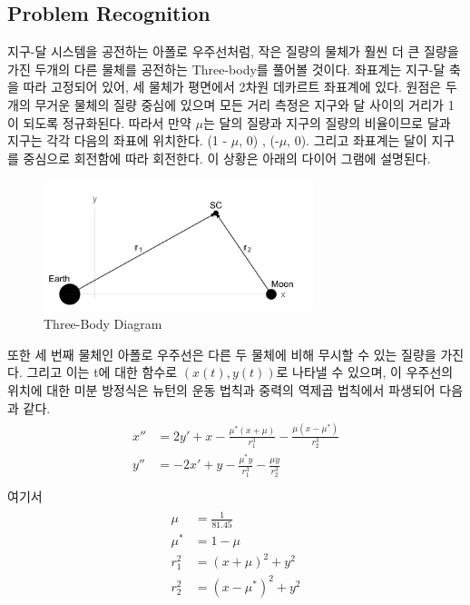 \documentclass[11pt]{article}
\begin{document}
\subsection{Problem Recognition} 
지구-달 시스템을 공전하는 아폴로 우주선처럼, 작은 질량의 물체가 훨씬 더 큰 질량을 가진 두개의 다른 물체를 공전하는 Three-body를 풀어볼 것이다. 좌표계는 지구-달 축을 따라 고정되어 있어, 세 물체가 평면에서 2차원 데카르트 좌표계에 있다. 원점은 두개의 무거운 물체의 질량 중심에 있으며 모든 거리 측정은 지구와 달 사이의 거리가 1이 되도록 정규화된다. 따라서 만약 $\mu$는 달의 질량과 지구의 질량의 비율이므로 달과 지구는 각각 다음의 좌표에 위치한다. (1 - $\mu$, 0) , (-$\mu$, 0). 그리고 좌표계는 달이 지구를 중심으로 회전함에 따라 회전한다. 이 상황은 아래의 다이어 그램에 설명된다.
\begin{figure}[!ht]
  \centering
  \includegraphics[width=0.7\textwidth]{Three.png}
  \caption{Three-Body Diagram}
\end{figure}
또한 세 번째 물체인 아폴로 우주선은 다른 두 물체에 비해 무시할 수 있는 질량을 가진다. 그리고 이는 t에 대한 함수로 $(x(t), y(t))$로 나타낼 수 있으며, 이 우주선의 위치에 대한 미분 방정식은 뉴턴의 운동 법칙과 중력의 역제곱 법칙에서 파생되어 다음과 같다.
\begin{equation}
\begin{split}
\begin{aligned}
x'' &= 2y' + x - \frac{\mu^* (x + \mu)}{r_1^3} - \frac{\mu (x - \mu^*)}{r_2^3} \\
y'' &= -2x' + y - \frac{\mu^* y}{r_1^3} - \frac{\mu y}{r_2^3} \\
\end{aligned}
\end{split}
\end{equation}
여기서 
\begin{equation}
\begin{split}
\begin{aligned}
\mu &= \frac{1}{81.45} \\
\mu^* &= 1 - \mu \\
r_1^2 &= (x + \mu)^2 + y^2 \\
r_2^2 &= (x - \mu^*)^2 + y^2
\end{aligned}
\end{split}
\end{equation}
\end{document}
